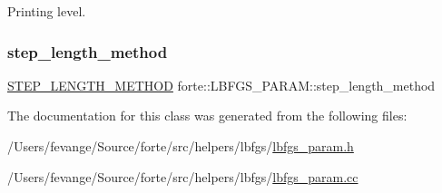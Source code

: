Printing level. 

\mbox{\label{classforte_1_1_l_b_f_g_s___p_a_r_a_m_a162b78847700b01f76621ab357267172}} 
\subsubsection{\texorpdfstring{step\+\_\+length\+\_\+method}{step\_length\_method}}
{\footnotesize\ttfamily \mbox{\hyperlink{classforte_1_1_l_b_f_g_s___p_a_r_a_m_a2651cd29e6c97352a8b72df089d97cfa}{S\+T\+E\+P\+\_\+\+L\+E\+N\+G\+T\+H\+\_\+\+M\+E\+T\+H\+OD}} forte\+::\+L\+B\+F\+G\+S\+\_\+\+P\+A\+R\+A\+M\+::step\+\_\+length\+\_\+method}



The documentation for this class was generated from the following files\+:\begin{DoxyCompactItemize}
\item 
/\+Users/fevange/\+Source/forte/src/helpers/lbfgs/\mbox{\hyperlink{lbfgs__param_8h}{lbfgs\+\_\+param.\+h}}\item 
/\+Users/fevange/\+Source/forte/src/helpers/lbfgs/\mbox{\hyperlink{lbfgs__param_8cc}{lbfgs\+\_\+param.\+cc}}\end{DoxyCompactItemize}
